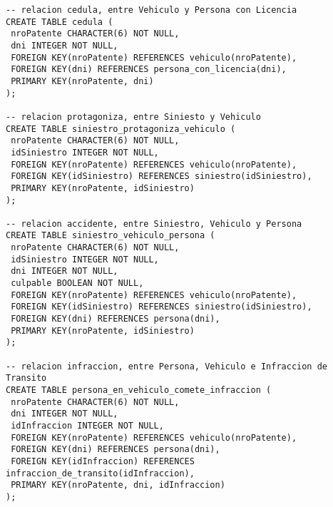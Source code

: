 \begin{verbatim}
-- relacion cedula, entre Vehiculo y Persona con Licencia
CREATE TABLE cedula (
 nroPatente CHARACTER(6) NOT NULL,
 dni INTEGER NOT NULL,
 FOREIGN KEY(nroPatente) REFERENCES vehiculo(nroPatente),
 FOREIGN KEY(dni) REFERENCES persona_con_licencia(dni),
 PRIMARY KEY(nroPatente, dni)
);

-- relacion protagoniza, entre Siniesto y Vehiculo
CREATE TABLE siniestro_protagoniza_vehiculo (
 nroPatente CHARACTER(6) NOT NULL,
 idSiniestro INTEGER NOT NULL,
 FOREIGN KEY(nroPatente) REFERENCES vehiculo(nroPatente),
 FOREIGN KEY(idSiniestro) REFERENCES siniestro(idSiniestro),
 PRIMARY KEY(nroPatente, idSiniestro)
);

-- relacion accidente, entre Siniestro, Vehiculo y Persona
CREATE TABLE siniestro_vehiculo_persona (
 nroPatente CHARACTER(6) NOT NULL,
 idSiniestro INTEGER NOT NULL,
 dni INTEGER NOT NULL,
 culpable BOOLEAN NOT NULL,
 FOREIGN KEY(nroPatente) REFERENCES vehiculo(nroPatente),
 FOREIGN KEY(idSiniestro) REFERENCES siniestro(idSiniestro),
 FOREIGN KEY(dni) REFERENCES persona(dni), 
 PRIMARY KEY(nroPatente, idSiniestro)
);

-- relacion infraccion, entre Persona, Vehiculo e Infraccion de Transito
CREATE TABLE persona_en_vehiculo_comete_infraccion (
 nroPatente CHARACTER(6) NOT NULL,
 dni INTEGER NOT NULL,
 idInfraccion INTEGER NOT NULL,
 FOREIGN KEY(nroPatente) REFERENCES vehiculo(nroPatente),
 FOREIGN KEY(dni) REFERENCES persona(dni), 
 FOREIGN KEY(idInfraccion) REFERENCES infraccion_de_transito(idInfraccion), 
 PRIMARY KEY(nroPatente, dni, idInfraccion)
);
\end{verbatim}

